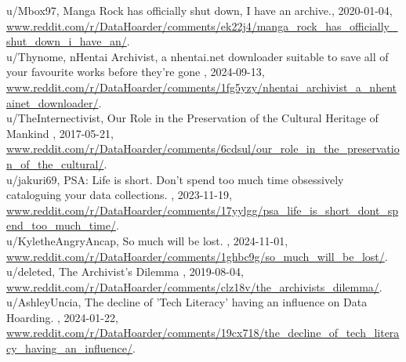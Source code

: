 u/Mbox97, \og Manga Rock has officially shut down, I have an archive.\fg, 2020-01-04, \href{www.reddit.com/r/DataHoarder/comments/ek22j4/manga\_rock\_has\_officially\_shut\_down\_i\_have\_an/}{www.reddit.com/r/DataHoarder/comments/ek22j4/manga\_rock\_has\_officially\_shut\_down\_i\_have\_an/}. \\

u/Thynome, \og nHentai Archivist, a nhentai.net downloader suitable to save all of your favourite works before they're gone \fg, 2024-09-13, \href{www.reddit.com/r/DataHoarder/comments/1fg5yzy/nhentai\_archivist\_a\_nhentainet\_downloader/}{www.reddit.com/r/DataHoarder/comments/1fg5yzy/nhentai\_archivist\_a\_nhentainet\_downloader/}. \\

u/TheInternectivist, \og Our Role in the Preservation of the Cultural Heritage of Mankind \fg, 2017-05-21, \href{www.reddit.com/r/DataHoarder/comments/6cdsul/our\_role\_in\_the\_preservation\_of\_the\_cultural/}{www.reddit.com/r/DataHoarder/comments/6cdsul/our\_role\_in\_the\_preservation\_of\_the\_cultural/}. \\

u/jakuri69, \og PSA: Life is short. Don't spend too much time obsessively cataloguing your data collections. \fg, 2023-11-19, \href{www.reddit.com/r/DataHoarder/comments/17yylgg/psa\_life\_is\_short\_dont\_spend\_too\_much\_time/}{www.reddit.com/r/DataHoarder/comments/17yylgg/psa\_life\_is\_short\_dont\_spend\_too\_much\_time/}. \\

u/KyletheAngryAncap, \og So much will be lost. \fg, 2024-11-01, \href{www.reddit.com/r/DataHoarder/comments/1ghbc9g/so\_much\_will\_be\_lost/}{www.reddit.com/r/DataHoarder/comments/1ghbc9g/so\_much\_will\_be\_lost/}. \\

u/deleted, \og The Archivist's Dilemma \fg, 2019-08-04, \href{www.reddit.com/r/DataHoarder/comments/clz18v/the\_archivists\_dilemma/}{www.reddit.com/r/DataHoarder/comments/clz18v/the\_archivists\_dilemma/}. \\

u/AshleyUncia, \og The decline of 'Tech Literacy' having an influence on Data Hoarding. \fg, 2024-01-22, \href{www.reddit.com/r/DataHoarder/comments/19cx718/the\_decline\_of\_tech\_literacy\_having\_an\_influence/}{www.reddit.com/r/DataHoarder/comments/19cx718/the\_decline\_of\_tech\_literacy\_having\_an\_influence/}. \\

